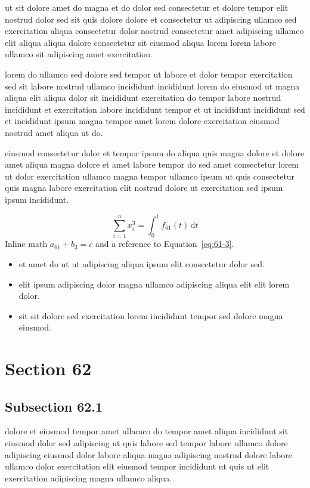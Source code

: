 \documentclass{article}
\begin{document}
ut sit dolore amet do magna et do dolor sed consectetur et dolore tempor elit nostrud dolor sed sit quis dolore dolore et consectetur ut adipiscing ullamco sed exercitation aliqua consectetur dolor nostrud consectetur amet adipiscing ullamco elit aliqua aliqua dolore consectetur sit eiusmod aliqua lorem lorem labore ullamco sit adipiscing amet exercitation.

lorem do ullamco sed dolore sed tempor ut labore et dolor tempor exercitation sed sit labore nostrud ullamco incididunt incididunt lorem do eiusmod ut magna aliqua elit aliqua dolor sit incididunt exercitation do tempor labore nostrud incididunt et exercitation labore incididunt tempor et ut incididunt incididunt sed et incididunt ipsum magna tempor amet lorem dolore exercitation eiusmod nostrud amet aliqua ut do.

eiusmod consectetur dolor et tempor ipsum do aliqua quis magna dolore et dolore amet aliqua magna dolore et amet labore tempor do sed amet consectetur lorem ut dolor exercitation ullamco magna tempor ullamco ipsum ut quis consectetur quis magna labore exercitation elit nostrud dolore ut exercitation sed ipsum ipsum incididunt.

\begin{equation}\label{eq:61-3}
  \sum_{i=1}^{n} x_i^{3} = \int_0^1 f_{61}(t)\,\mathrm{d}t
\end{equation}
Inline math $a_{61} + b_{3} = c$ and a reference to Equation~\eqref{eq:61-3}.

\begin{itemize}
  \item et amet do ut ut adipiscing aliqua ipsum elit consectetur dolor sed.
  \item elit ipsum adipiscing dolor magna ullamco adipiscing aliqua elit elit lorem dolor.
  \item sit sit dolore sed exercitation lorem incididunt tempor sed dolore magna eiusmod.
\end{itemize}

\section{Section 62}\label{sec:62}
\subsection{Subsection 62.1}\label{sec:62-1}
dolore et eiusmod tempor amet ullamco do tempor amet aliqua incididunt sit eiusmod dolor sed adipiscing ut quis labore sed tempor labore ullamco dolore adipiscing eiusmod dolor labore aliqua magna adipiscing nostrud dolore labore ullamco dolor exercitation elit eiusmod tempor incididunt ut quis ut elit exercitation adipiscing magna ullamco aliqua.
\end{document}
